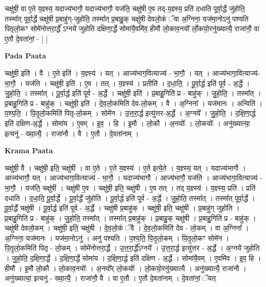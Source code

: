 \documentclass[17pt]{extarticle}
\begin{document}
चक्षु॑षी॒ वा ए॒ते य॒ज्ञ्स्य॒ यदाज्य॑भागौ॒ यदाज्य॑भागौ॒ यज॑ति॒ चक्षु॑षी ए॒व तद्-य॒ज्ञ्स्य॒ प्रति॑ दधाति पूर्वा॒र्द्धे जु॑होति॒ तस्मा᳚त् पूर्वा॒र्द्धे चक्षु॑षी प्र॒बाहु॑ग्-जुहोति॒ तस्मा᳚त् प्र॒बाहु॒क् चक्षु॑षी देवलो॒कं ॅवा अ॒ग्निना॒ यज॑मा॒नोऽनु॑ पश्यति पितृलो॒कꣳ सोमे॑नोत्तरा॒र्द्धे᳚ ऽग्नये॑ जुहोति दक्षिणा॒र्द्धे सोमा॑यै॒वमि॑व॒ हीमौ लो॒काव॒नयो᳚ र्लो॒कयो॒रनु॑ख्यात्यै॒ राजा॑नौ॒ वा ए॒तौ दे॒वता॑नां॒ - [  ] \newline

\textbf{Pada Paata} \newline

चक्षु॑षी॒ इति॑ । वै । ए॒ते इति॑ । य॒ज्ञ्स्य॑ । यत् । आज्य॑भाग॒वित्याज्य॑ - भा॒गौ॒ । यत् । आज्य॑भागा॒वित्याज्य॑-भा॒गौ॒ । यज॑ति । चक्षु॑षी॒ इति॑ । ए॒व । तत् । य॒ज्ञ्स्य॑ । प्रतीति॑ । द॒धा॒ति॒ । पू॒र्वा॒र्द्ध इति॑ पूर्व - अ॒र्द्धे । जु॒हो॒ति॒ । तस्मा᳚त् । पू॒र्वा॒र्द्ध इति॑ पूर्व - अ॒र्द्धे । चक्षु॑षी॒ इति॑ । प्र॒बाहु॒गिति॑ प्र - बाहु॑क् । जु॒हो॒ति॒ । तस्मा᳚त् । प्र॒बाहु॒गिति॑ प्र - बाहु॑क् । चक्षु॑षी॒ इति॑ । दे॒व॒लो॒कमिति॑ देव-लो॒कम् । वै । अ॒ग्निना᳚ । यज॑मानः । अन्विति॑ । प॒श्य॒ति॒ । पि॒तृ॒लो॒कमिति॑ पितृ-लो॒कम् । सोमे॑न । उ॒त्त॒रा॒र्द्ध इत्यु॑त्तर-अ॒र्द्धे । अ॒ग्नये᳚ । जु॒हो॒ति॒ । द॒क्षि॒णा॒र्द्ध इति॑ दक्षिण-अ॒र्द्धे । सोमा॑य । ए॒वम् । इ॒व॒ । हि । इ॒मौ । लो॒कौ । अ॒नयोः᳚ । लो॒कयोः᳚ । अनु॑ख्यात्या॒ इत्यनु॑ - ख्या॒त्यै॒ । राजा॑नौ । वै । ए॒तौ । दे॒वता॑नाम् ।  \newline


\textbf{Krama Paata} \newline

चक्षु॑षी॒ वै । चक्षु॑षी॒ इति॒ चक्षु॑षी । वा ए॒ते । ए॒ते य॒ज्ञ्स्य॑ । ए॒ते इत्ये॒ते । य॒ज्ञ्स्य॒ यत् । यदाज्य॑भागौ । आज्य॑भागौ॒ यत् । आज्य॑भागा॒वित्याज्य॑ - भा॒गौ॒ । यदाज्य॑भागौ । आज्य॑भागौ॒ यज॑ति । आज्य॑भागा॒वित्याज्य॑ - भा॒गौ॒ । यज॑ति॒ चक्षु॑षी । चक्षु॑षी ए॒व । चक्षु॑षी॒ इति॒ चक्षु॑षी । ए॒व तत् । तद् य॒ज्ञ्स्य॑ । य॒ज्ञ्स्य॒ प्रति॑ । प्रति॑ दधाति । द॒धा॒ति॒ पू॒र्वा॒र्द्धे । पू॒र्वा॒र्द्धे जु॑होति । पू॒र्वा॒र्द्ध इति॑ पूर्व - अ॒र्द्धे । जु॒हो॒ति॒ तस्मा᳚त् । तस्मा᳚त् पूर्वा॒र्द्धे । पू॒र्वा॒र्द्धे चक्षु॑षी । पू॒र्वा॒र्द्ध इति॑ पूर्व - अ॒र्द्धे । चक्षु॑षी प्र॒बाहु॑क् । चक्षु॑षी॒ इति॒ चक्षु॑षी । प्र॒बाहु॑ग् जुहोति । प्र॒बाहु॒गिति॑ प्र - बाहु॑क् । जु॒हो॒ति॒ तस्मा᳚त् । तस्मा᳚त् प्र॒बाहु॑क् । प्र॒बाहु॒क् चक्षु॑षी । प्र॒बाहु॒गिति॑ प्र - बाहु॑क् । चक्षु॑षी देवलो॒कम् । चक्षु॑षी॒ इति॒ चक्षु॑षी । दे॒व॒लो॒कं ॅवै । दे॒व॒लो॒कमिति॑ देव - लो॒कम् । वा अ॒ग्निना᳚ । अ॒ग्निना॒ यज॑मानः । यज॑मा॒नोऽनु॑ । अनु॑ पश्यति । प॒श्य॒ति॒ पि॒तृ॒लो॒कम् । पि॒तृ॒लो॒कꣳ सोमे॑न । पि॒तृ॒लो॒कमिति॑ पितृ - लो॒कम् । सोमे॑नोत्तरा॒र्द्धे । उ॒त्त॒रा॒र्द्धे᳚ऽग्नये᳚ । उ॒त्त॒रा॒र्द्ध इत्यु॑त्तर - अ॒र्द्धे । अ॒ग्नये॑ जुहोति । जु॒हो॒ति॒ द॒क्षि॒णा॒र्द्धे । द॒क्षि॒णा॒र्द्धे सोमा॑य । द॒क्षि॒णा॒र्द्ध इति॑ दक्षिण - अ॒र्द्धे । सोमा॑यै॒वम् । ए॒वमि॑व । इ॒व॒ हि । हीमौ । इ॒मौ लो॒कौ । लो॒काव॒नयोः᳚ । अ॒नयो᳚र् लो॒कयोः᳚ । लो॒कयो॒रनु॑ख्यात्यै । अनु॑ख्यात्यै॒ राजा॑नौ । अनु॑ख्यात्या॒ इत्यनु॑ - ख्या॒त्यै॒ । राजा॑नौ॒ वै । वा ए॒तौ । ए॒तौ दे॒वता॑नाम् । दे॒वता॑नां॒ ॅयत् \newline
\end{document}
